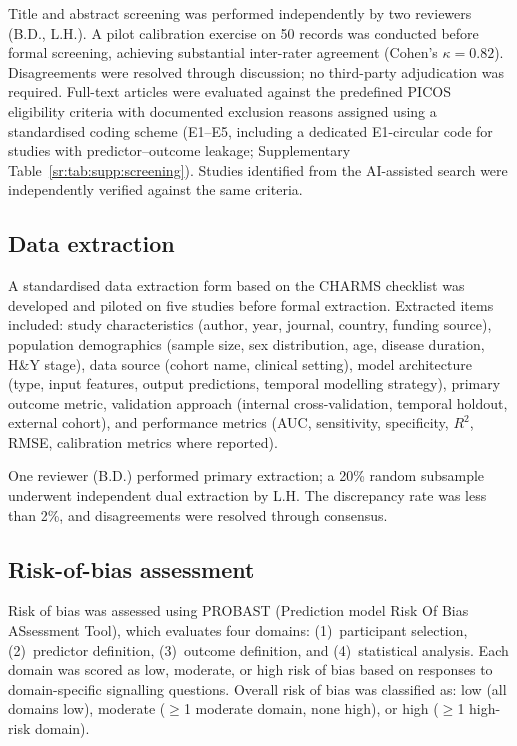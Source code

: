 Title and abstract screening was performed independently by two reviewers (B.D., L.H.). A pilot calibration exercise on 50 records was conducted before formal screening, achieving substantial inter-rater agreement (Cohen's $\kappa = 0.82$). Disagreements were resolved through discussion; no third-party adjudication was required. Full-text articles were evaluated against the predefined PICOS eligibility criteria with documented exclusion reasons assigned using a standardised coding scheme (E1--E5, including a dedicated E1-circular code for studies with predictor--outcome leakage; Supplementary Table~\ref{sr:tab:supp:screening}). Studies identified from the AI-assisted search were independently verified against the same criteria.

\subsection{Data extraction}
\label{sr:sec:methods:extraction}

A standardised data extraction form based on the CHARMS checklist\cite{moons2014} was developed and piloted on five studies before formal extraction. Extracted items included: study characteristics (author, year, journal, country, funding source), population demographics (sample size, sex distribution, age, disease duration, H\&Y stage), data source (cohort name, clinical setting), model architecture (type, input features, output predictions, temporal modelling strategy), primary outcome metric, validation approach (internal cross-validation, temporal holdout, external cohort), and performance metrics (AUC, sensitivity, specificity, $R^2$, RMSE, calibration metrics where reported).

One reviewer (B.D.) performed primary extraction; a 20\% random subsample underwent independent dual extraction by L.H. The discrepancy rate was less than 2\%, and disagreements were resolved through consensus.

\subsection{Risk-of-bias assessment}
\label{sr:sec:methods:rob}

Risk of bias was assessed using PROBAST (Prediction model Risk Of Bias ASsessment Tool)\cite{wolff2019}, which evaluates four domains: (1)~participant selection, (2)~predictor definition, (3)~outcome definition, and (4)~statistical analysis. Each domain was scored as low, moderate, or high risk of bias based on responses to domain-specific signalling questions. Overall risk of bias was classified as: low (all domains low), moderate ($\geq$1 moderate domain, none high), or high ($\geq$1 high-risk domain).

